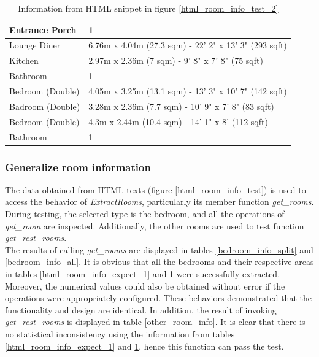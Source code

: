 \documentclass[12pt,twoside]{report}
\begin{document}
\begin{table}[!htbp]
	\centering
	\caption{Information from HTML snippet in figure \ref*{html_room_info_test_2}}
	\begin{tabular} {| l | l |}
		\hline
		Entrance Porch & 1\\
		\hline
		Lounge Diner & 6.76m x 4.04m (27.3 sqm) - 22' 2" x 13' 3" (293 sqft)\\
		\hline
		Kitchen & 2.97m x 2.36m (7 sqm) - 9' 8" x 7' 8" (75 sqft)\\
		\hline
		Bathroom & 1\\
		\hline
		Bedroom (Double) & 4.05m x 3.25m (13.1 sqm) - 13' 3" x 10' 7" (142 sqft)\\
		\hline 
		Badroom (Double) & 3.28m x 2.36m (7.7 sqm) - 10' 9" x 7' 8" (83 sqft)\\
		\hline
		Bedroom (Double) & 4.3m x 2.44m (10.4 sqm) - 14' 1" x 8' (112 sqft)\\
		\hline
		Bathroom & 1\\
		\hline
	\end{tabular}
	\label{html_room_info_expect_2}
\end{table}

\subsubsection{Generalize room information}
The data obtained from HTML texts (figure \ref{html_room_info_test}) is used to access the behavior of \textit{ExtractRooms}, particularly its member function \textit{get\_rooms}. During testing, the selected type is the bedroom, and all the operations of \textit{get\_room} are inspected. Additionally, the other rooms are used to test function \textit{get\_rest\_rooms}. 
\\

The results of calling \textit{get\_rooms} are displayed in tables \ref{bedroom_info_split} and \ref{bedroom_info_all}. It is obvious that all the bedrooms and their respective areas in tables \ref{html_room_info_expect_1} and \ref{html_room_info_expect_2} were successfully extracted. Moreover, the numerical values could also be obtained without error if the operations were appropriately configured. These behaviors demonstrated that the functionality and design are identical. In addition, the result of invoking \textit{get\_rest\_rooms} is displayed in table \ref{other_room_info}. It is clear that there is no statistical inconsistency using the information from tables \ref{html_room_info_expect_1} and \ref{html_room_info_expect_2}, hence this function can pass the test. 
\end{document}
